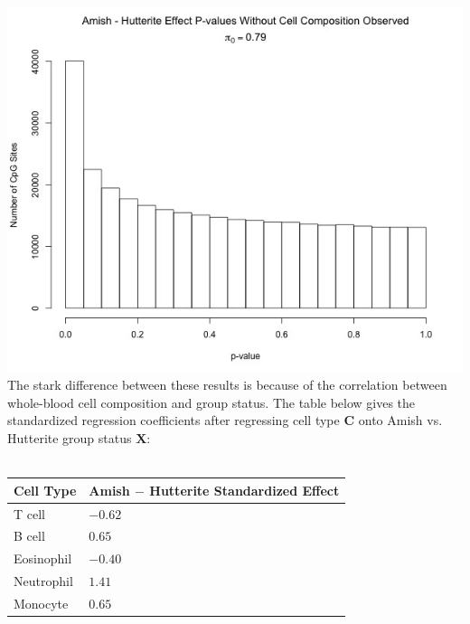 \documentclass{article}
\begin{document}
\includegraphics[scale=0.4]{AmishHutterite_noCellPvalues.jpeg}\\
\indent The stark difference between these results is because of the correlation between whole-blood cell composition and group status. The table below gives the standardized regression coefficients after regressing cell type $\bm{C}$ onto Amish vs. Hutterite group status $\bm{X}$:\\
\\
\begin{tabular}{ |p{1.5cm}||p{3cm}| }
\hline
Cell Type & Amish $-$ Hutterite Standardized Effect\\
\hline
T cell & $-0.62$\\\hline
B cell & $0.65$\\\hline
Eosinophil & $-0.40$\\\hline
Neutrophil & $1.41$\\\hline
Monocyte & $0.65$\\\hline
\end{tabular}\\
\end{document}
